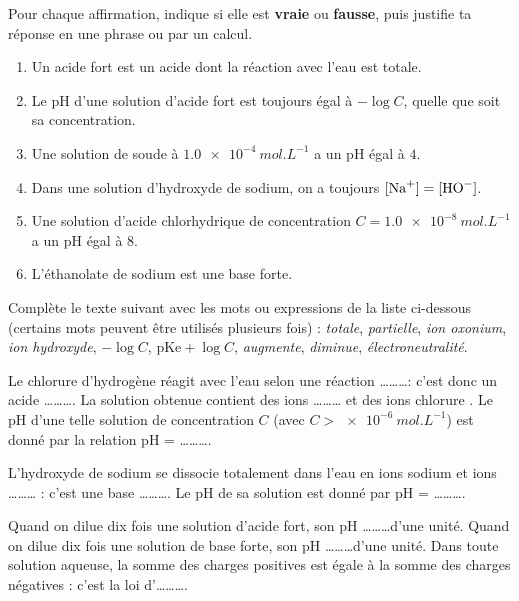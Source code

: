 \documentclass[11pt]{article}
\begin{document}
\begin{exercice}
Pour chaque affirmation, indique si elle est \textbf{vraie} ou \textbf{fausse}, puis justifie ta réponse en une phrase ou par un calcul.
\begin{enumerate}
\item Un acide fort est un acide dont la réaction avec l'eau est totale.
\item Le pH d'une solution d'acide fort est toujours égal à $-\log C$, quelle que soit sa concentration.
\item Une solution de soude à $\SI{1,0e-4}{mol.L^{-1}}$ a un pH égal à $4$.
\item Dans une solution d'hydroxyde de sodium, on a toujours $[\ce{Na+}] = [\ce{HO-}]$.
\item Une solution d'acide chlorhydrique de concentration $C = \SI{1,0e-8}{mol.L^{-1}}$ a un pH égal à $8$.
\item L'éthanolate de sodium  est une base forte.
\end{enumerate}
\end{exercice}

\begin{exercice}
Complète le texte suivant avec les mots ou expressions de la liste ci-dessous (certains mots peuvent être utilisés plusieurs fois) : \emph{totale}, \emph{partielle}, \emph{ion oxonium}, \emph{ion hydroxyde}, \emph{$-\log C$}, \emph{$\mathrm{pKe} + \log C$}, \emph{augmente}, \emph{diminue}, \emph{électroneutralité}.

Le chlorure d'hydrogène  réagit avec l'eau selon une réaction \ldots\ldots\ldots : c'est donc un acide \ldots\ldots\ldots. La solution obtenue contient des ions \ldots\ldots\ldots {} et des ions chlorure . Le pH d'une telle solution de concentration $C$ (avec $C > \SI{e-6}{mol.L^{-1}}$) est donné par la relation pH = \ldots\ldots\ldots.

L'hydroxyde de sodium  se dissocie totalement dans l'eau en ions sodium  et ions \ldots\ldots\ldots {} : c'est une base \ldots\ldots\ldots. Le pH de sa solution est donné par pH = \ldots\ldots\ldots.

Quand on dilue dix fois une solution d'acide fort, son pH \ldots\ldots\ldots d'une unité. Quand on dilue dix fois une solution de base forte, son pH \ldots\ldots\ldots d'une unité. Dans toute solution aqueuse, la somme des charges positives est égale à la somme des charges négatives : c'est la loi d'\ldots\ldots\ldots.
\end{exercice}
\end{document}
